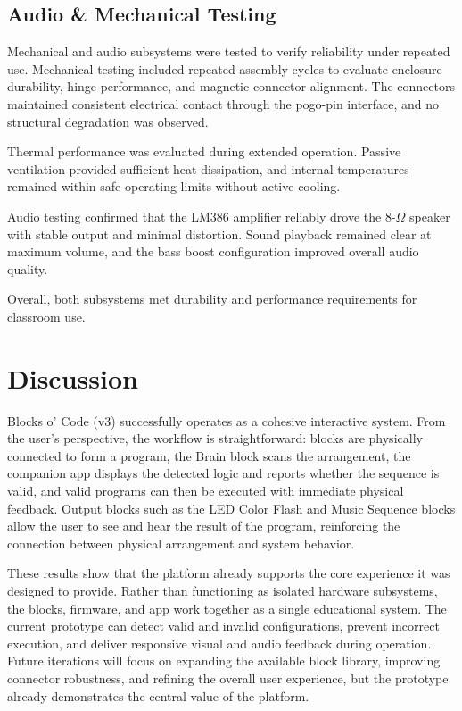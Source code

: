 \documentclass[10pt, conference]{IEEEtran}
\begin{document}
\subsection{Audio \& Mechanical Testing}

Mechanical and audio subsystems were tested to verify reliability under repeated use. Mechanical testing included repeated assembly cycles to evaluate enclosure durability, hinge performance, and magnetic connector alignment. The connectors maintained consistent electrical contact through the pogo-pin interface, and no structural degradation was observed.

Thermal performance was evaluated during extended operation. Passive ventilation provided sufficient heat dissipation, and internal temperatures remained within safe operating limits without active cooling.

Audio testing confirmed that the LM386 amplifier reliably drove the 8-$\Omega$ speaker with stable output and minimal distortion. Sound playback remained clear at maximum volume, and the bass boost configuration improved overall audio quality.

Overall, both subsystems met durability and performance requirements for classroom use.

\section{Discussion}
Blocks o' Code (v3) successfully operates as a cohesive interactive system. From the user's perspective, the workflow is straightforward: blocks are physically connected to form a program, the Brain block scans the arrangement, the companion app displays the detected logic and reports whether the sequence is valid, and valid programs can then be executed with immediate physical feedback. Output blocks such as the LED Color Flash and Music Sequence blocks allow the user to see and hear the result of the program, reinforcing the connection between physical arrangement and system behavior. 

These results show that the platform already supports the core experience it was designed to provide. Rather than functioning as isolated hardware subsystems, the blocks, firmware, and app work together as a single educational system. The current prototype can detect valid and invalid configurations, prevent incorrect execution, and deliver responsive visual and audio feedback during operation. Future iterations will focus on expanding the available block library, improving connector robustness, and refining the overall user experience, but the prototype already demonstrates the central value of the platform.
\end{document}
